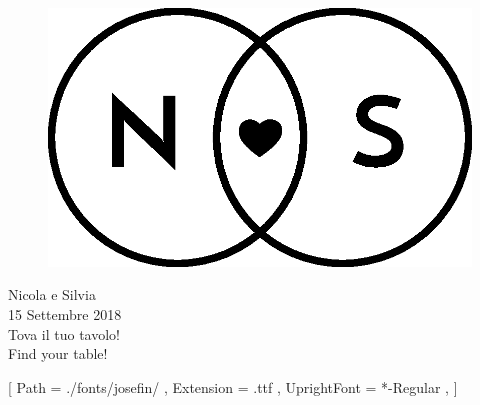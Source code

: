 \documentclass[20pt]{extarticle}
\begin{document}
\begin{figure}
\centering
\includegraphics[scale=1.3]{img/Logo_piccolo.eps}
\end{figure}
\begin{center}
\Huge Nicola e Silvia\\
\Large 15 Settembre 2018\\

\vspace{30mm}
{\fontsize{100}{120}\selectfont Tova il tuo tavolo!\\}
\vspace{5mm}
{\fontsize{100}{120}\selectfont Find your table!}
\vspace{30mm}
\end{center}
\setmainfont{JosefinSans}[
Path = ./fonts/josefin/ ,
Extension = .ttf ,
UprightFont = *-Regular ,
]
\begin{figure}[h!]
\centering
\large{}
\end{figure}
\end{document}
